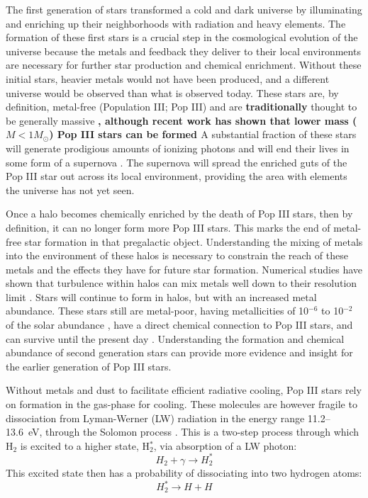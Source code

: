 \documentclass[fleqn,usenatbib]{mnras}
\begin{document}
The first generation of stars transformed a cold and dark universe
by illuminating and enriching up their neighborhoods with radiation
and heavy elements. The formation of these first stars is a crucial step in the cosmological evolution of the universe because the metals and feedback they deliver to their local environments are necessary for further star production and chemical enrichment. Without these initial stars, heavier metals would not have been produced, and a different universe would be observed than what is observed today. These stars are, by definition, metal-free (Population III; Pop III) and are \textbf{traditionally} thought to be generally massive \citep{ABN02, Bromm02_P3, Turk09, Hosokawa11, Hosokawa16, Hirano15}\textbf{, although recent work has shown that lower mass ($M < 1 M_{\odot}$) Pop III stars can be formed \citep{Greif11_P3Cluster, Clark11_Frag, Stacy11}} A substantial fraction of these stars will generate prodigious amounts of ionizing photons and will end their lives in some form of a supernova \citep[e.g.][]{Schaerer02, Heger02}. The supernova will spread the enriched guts of the Pop III star out across its local environment, providing the area with elements the universe has not yet seen. 

Once a halo becomes chemically enriched by the death of Pop III stars, then by definition, it can no longer form more Pop III stars. This marks the end of metal-free star formation in that pregalactic object. Understanding the mixing of metals into the environment of these halos is necessary to constrain the reach of these metals and the effects they have for future star formation. Numerical studies have shown that turbulence within halos can mix metals well down to their resolution limit \citep{Wise08_Gal, Greif10, Smith15}. Stars will continue to form in halos, but with an increased metal abundance. These stars still are metal-poor, having metallicities of 10$^{-6}$ to 10$^{-2}$ of the solar abundance \citep{Chiaki16, Chiaki18, Ritter16}, have a direct chemical connection to Pop III stars, and can survive until the present day \citep{Gnedin06, Tumlinson10, Griffen18, Magg18, Ezzeddine19}. Understanding the formation and chemical abundance of second generation stars can provide more evidence and insight for the earlier generation of Pop III stars.

Without metals and dust to facilitate efficient radiative cooling, Pop III stars rely on \hh{} formation in the gas-phase for cooling. These molecules are however fragile to dissociation from Lyman-Werner (LW) radiation in the energy range 11.2--13.6~eV, through the Solomon process \citep{Field66, Stecher67}. This is a two-step process through which H$_{2}$ is excited to a higher state, H$_{2}^{\ast}$, via absorption of a LW photon:
\begin{equation} \label{Solomon1}
	H_{2} + \gamma \rightarrow  H_{2}^{\ast}
\end{equation}
This excited state then has a probability of dissociating into two hydrogen atoms:
\begin{equation} \label{Solomon2}
	H_{2}^{\ast} \rightarrow H + H
\end{equation}
\end{document}
